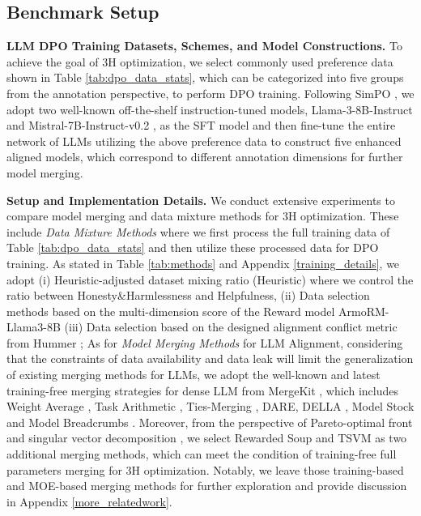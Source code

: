 \subsection{Benchmark Setup}

\textbf{LLM DPO Training Datasets, Schemes, and Model Constructions.} To achieve the goal of 3H optimization, we select commonly used preference data shown in Table \ref{tab:dpo_data_stats}, which can be categorized into five groups from the annotation perspective, to perform DPO training. Following SimPO \cite{meng2024simpo}, we adopt two well-known off-the-shelf instruction-tuned models, Llama-3-8B-Instruct \cite{dubey2024llama} and Mistral-7B-Instruct-v0.2 \cite{jiang2023mistral}, as the SFT model and then fine-tune the entire network of LLMs utilizing the above preference data to construct five enhanced aligned models, which correspond to different annotation dimensions for further model merging.

\textbf{Setup and Implementation Details.} We conduct extensive experiments to compare model merging and data mixture methods for 3H optimization. These include \textit{Data Mixture Methods} where we first process the full training data of Table \ref{tab:dpo_data_stats} and then utilize these processed data for DPO training. As stated in Table \ref{tab:methods} and Appendix \ref{training_details}, we adopt (i) Heuristic-adjusted dataset mixing ratio (Heuristic) where we control the ratio between Honesty\&Harmlessness and Helpfulness, (ii) Data selection methods based on the multi-dimension score of the Reward model ArmoRM-Llama3-8B \cite{wang2024interpretable} (iii) Data selection based on the designed alignment conflict metric from Hummer \cite{jiang2024hummer}; As for \textit{Model Merging Methods} for LLM Alignment, considering that the constraints of data availability and data leak will limit the generalization of existing merging methods for LLMs, we adopt the well-known and latest training-free merging strategies for dense LLM from MergeKit \cite{goddard2024arcee}, which includes Weight Average \cite{wortsman2022model}, Task Arithmetic \cite{ilharco2022editing}, Ties-Merging \cite{yadav2024ties}, DARE\cite{yu2024language}, DELLA \cite{deep2024DELLA}, Model Stock \cite{jang2025model} and  Model Breadcrumbs \cite{davari2025model}. Moreover, from the perspective of Pareto-optimal front \cite{jang2023personalized,rame2024rewarded,rame2024warm,rame2024warp} and singular vector decomposition  \cite{stoica2024model,zhong2024panacea,gargiulo2024task}, we select Rewarded Soup \cite{rame2024rewarded} and TSVM \cite{gargiulo2024task} as two additional merging methods, which can meet the condition of training-free full parameters merging for 3H optimization. Notably, we leave those training-based and MOE-based merging methods \cite{tekin2024h} for further exploration and provide discussion in Appendix \ref{more_relatedwork}.

